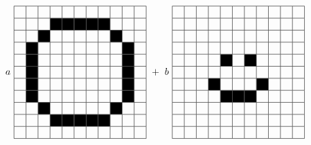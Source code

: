 \begin{prob}
\begin{enumerate}
\begin{align}
a~\begin{tabular}{|c|c|c|c|c|c|c|c|c|c|c|}
\hline
 &   &  &  & & & & & & & \\
 \hline
&    &   & \cellcolor{black}   & \cellcolor{black}   & \cellcolor{black}   & \cellcolor{black}  & \cellcolor{black}  & & & \\
 \hline
 &   &  \cellcolor{black} & & & & & & \cellcolor{black} & &    \\
 \hline
  &   \cellcolor{black} & & & & & & & & \cellcolor{black} &    \\
   \hline
    &   \cellcolor{black} & & & & & & & & \cellcolor{black} &    \\
     \hline
  &   \cellcolor{black} & & & & & & & & \cellcolor{black} &    \\
 \hline
  &   \cellcolor{black} & & & & & & & & \cellcolor{black} &    \\
   \hline
  &   \cellcolor{black} & & & & & & & & \cellcolor{black} &    \\
\hline
 &   &  \cellcolor{black} & & & & & & \cellcolor{black} & &    \\
 \hline
 &    &   & \cellcolor{black}   & \cellcolor{black}   & \cellcolor{black}   & \cellcolor{black}  & \cellcolor{black}  & & & \\
\hline
 &   &  &  & & & & & & & \\
 \hline
\end{tabular} ~+~b~& 
\begin{tabular}{|c|c|c|c|c|c|c|c|c|c|c|}
\hline
 &   &  &  & & & & & & & \\
 \hline
 &   &  &  & & & & & & & \\
 \hline
 &   &  &  & & & & & & & \\
 \hline
 &   &  &  & & & & & & & \\
   \hline
    &  & & & \cellcolor{black} & & \cellcolor{black}& & & &    \\
     \hline
 &   &  &  & & & & & & & \\
 \hline
  &  & &\cellcolor{black}  & & & & \cellcolor{black} & & &    \\
   \hline
  &  & & & \cellcolor{black} & \cellcolor{black}  & \cellcolor{black} & & & &    \\
\hline
 &   &  &  & & & & & & & \\
 \hline
 &   &  &  & & & & & & & \\
\hline
 &   &  &  & & & & & & & \\
 \hline
\end{tabular} \nonumber
\end{align}


\end{enumerate}
\end{prob}
